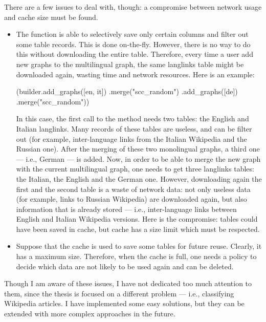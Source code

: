                 There are a few issues to deal with, though: a compromise between network usage and cache size must be found.
                \begin{itemize}
                    \item The  function is able to selectively save only certain columns and filter out some table records. This is done on-the-fly. However, there is no way to do this without downloading the entire table. Therefore, every time a user add new graphs to the multilingual graph, the same langlinks table might be downloaded again, wasting time and network resources. Here is an example:
                    \begin{example}
(builder.add_graphs([en, it])
        .merge("scc_random")
        .add_graphs([de])
        .merge("scc_random"))
                    \end{example}
                    In this case, the first call to the  method needs two tables: the English and Italian langlinks. Many records of these tables are useless, and can be filter out (for example, inter-language links from the Italian Wikipedia and the Russian one). After the merging of these two monolingual graphs, a third one --- i.e., German --- is added. Now, in order to be able to merge the new graph with the current multilingual graph, one needs to get three langlinks tables: the Italian, the English and the German one. However, downloading again the first and the second table is a waste of network data: not only useless data (for example, links to Russian Wikipedia) are downloaded again, but also information that is already stored --- i.e., inter-language links between English and Italian Wikipedia versions. Here is the compromise: tables could have been saved in cache, but cache has a size limit which must be respected.
                    \item Suppose that the cache is used to save some tables for future reuse. Clearly, it has a maximum size. Therefore, when the cache is full, one needs a policy to decide which data are not likely to be used again and can be deleted.
                \end{itemize}
                
                Though I am aware of these issues, I have not dedicated too much attention to them, since the thesis is focused on a different problem --- i.e., classifying Wikipedia articles. I have implemented some easy solutions, but they can be extended with more complex approaches in the future.
                
